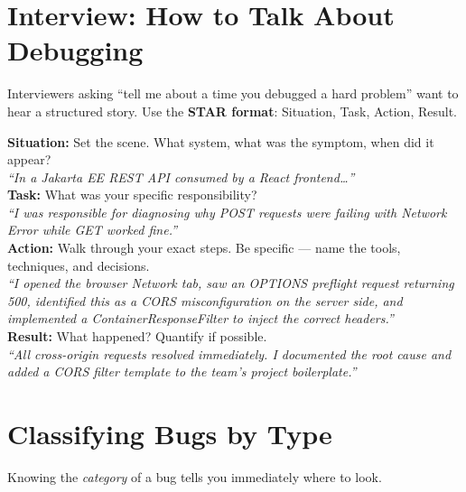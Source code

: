 \documentclass[11pt, letterpaper]{article}
\begin{document}
\section*{Interview: How to Talk About Debugging}

Interviewers asking ``tell me about a time you debugged a hard problem'' want to hear a structured story. Use the \textbf{STAR format}: Situation, Task, Action, Result.

\begin{tcolorbox}[colback=notebg, colframe=noteborder,
  title={\bfseries STAR Template for Debugging Stories}, arc=3pt, boxrule=1pt]
\textbf{Situation:} Set the scene. What system, what was the symptom, when did it appear?\\
\textit{``In a Jakarta EE REST API consumed by a React frontend\ldots''}\\[4pt]
\textbf{Task:} What was your specific responsibility?\\
\textit{``I was responsible for diagnosing why POST requests were failing with Network Error while GET worked fine.''}\\[4pt]
\textbf{Action:} Walk through your exact steps. Be specific --- name the tools, techniques, and decisions.\\
\textit{``I opened the browser Network tab, saw an OPTIONS preflight request returning 500, identified this as a CORS misconfiguration on the server side, and implemented a ContainerResponseFilter to inject the correct headers.''}\\[4pt]
\textbf{Result:} What happened? Quantify if possible.\\
\textit{``All cross-origin requests resolved immediately. I documented the root cause and added a CORS filter template to the team's project boilerplate.''}
\end{tcolorbox}

\section*{Classifying Bugs by Type}

Knowing the \emph{category} of a bug tells you immediately where to look.
\end{document}
